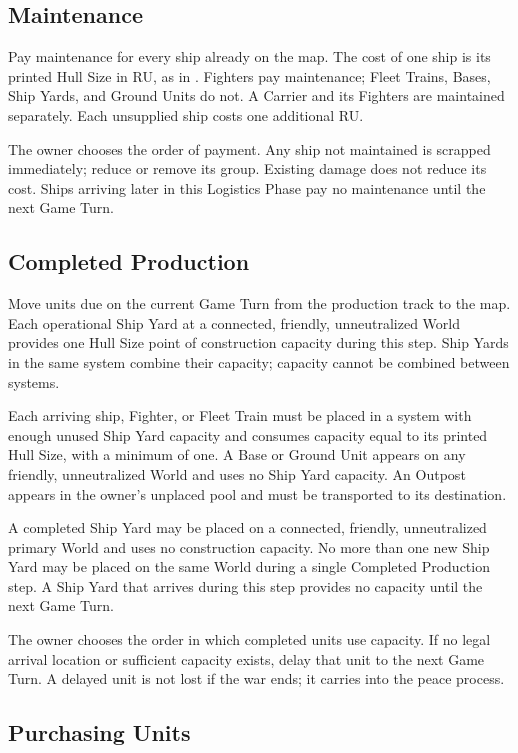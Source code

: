 \subsection{Maintenance}

Pay maintenance for every ship already on the map. The cost of one ship is its
printed Hull Size in RU, as in \SpaceEmpires. Fighters pay maintenance;
Fleet Trains, Bases, Ship Yards, and Ground Units do not. A Carrier and its
Fighters are maintained separately. Each unsupplied ship costs one additional
RU.

The owner chooses the order of payment. Any ship not maintained is scrapped
immediately; reduce or remove its group. Existing damage does not reduce its
cost. Ships arriving later in this Logistics Phase pay no maintenance until
the next Game Turn.

\subsection{Completed Production}

Move units due on the current Game Turn from the production track to the map.
Each operational Ship Yard at a connected, friendly, unneutralized World
provides one Hull Size point of construction capacity during this step. Ship
Yards in the same system combine their capacity; capacity cannot be combined
between systems.

Each arriving ship, Fighter, or Fleet Train must be placed in a system with
enough unused Ship Yard capacity and consumes capacity equal to its printed
Hull Size, with a minimum of one. A Base or Ground Unit appears on any
friendly, unneutralized World and uses no Ship Yard capacity. An Outpost
appears in the owner's unplaced pool and must be transported to its
destination.

A completed Ship Yard may be placed on a connected, friendly, unneutralized
primary World and uses no construction capacity. No more than one new Ship
Yard may be placed on the same World during a single Completed Production
step. A Ship Yard that arrives during this step provides no capacity until the
next Game Turn.

The owner chooses the order in which completed units use capacity. If no legal
arrival location or sufficient capacity exists, delay that unit to the next
Game Turn. A delayed unit is not lost if the war ends; it carries into the
peace process.

\subsection{Purchasing Units}

